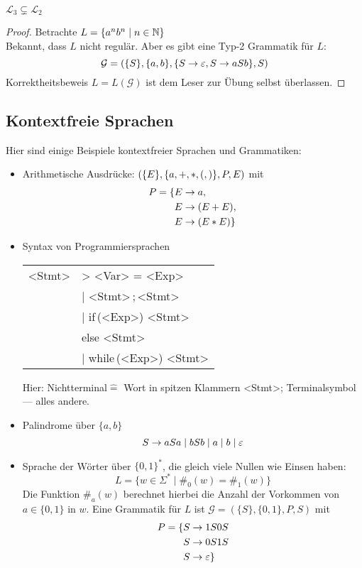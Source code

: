 {\begin{lemma}
	$\mathcal{L}_3 \subsetneq \mathcal{L}_2$
\end{lemma}
\begin{proof}
	Betrachte $L=\{a^nb^n \mid n\in\mathbb{N} \}$\\
	Bekannt, dass $L$ nicht regulär. 
	Aber es gibt eine Typ-2 Grammatik für $L$:
	\[ \mathcal{G} = (\{S\}, \{a,b\}, \{S\->\Eps, S\->aSb \}, S) \]
	Korrektheitsbeweis $L=L(\mathcal{G})$ ist dem Leser zur Übung selbst überlassen.
\end{proof}

\subsection{Kontextfreie Sprachen}
Hier sind einige Beispiele kontextfreier Sprachen und Grammatiken:
\begin{itemize}
\item Arithmetische Ausdrücke: $(\{E\}, \{a, \mathnormal{+}, \mathnormal{*}, \mathnormal{(}, \mathnormal{)}\}, P, E)$ mit
  \begin{displaymath}
    P =
    \begin{aligned}[t]
      \{ E &\->a, \\
        E &\->(E+E), \\
        E &\->(E*E) \}
    \end{aligned}
  \end{displaymath}
\item Syntax von Programmiersprachen%
	\begin{center}
		\begin{tabular}[t]{r@{ }l}
			<Stmt> &\-> <Var> = <Exp>\\
			&| <Stmt>\,;\,<Stmt>\\
			&| if\,(<Exp>) <Stmt>\\
			&\phantom{|} else <Stmt>\\
			&| while\,(<Exp>) <Stmt>
		\end{tabular}
	\end{center}%
	Hier: Nichtterminal$\hat=$ Wort in spitzen Klammern <Stmt>;
	Terminalsymbol --- alles andere.
\item Palindrome über $\{a,b\}$
	\[ S\-> aSa \mid bSb \mid a \mid b \mid \Eps \]
\item Sprache der Wörter über $\{0,1\}^*$, die gleich viele Nullen wie Einsen haben:
  \begin{displaymath}
    L = \{ w \in \Sigma^* \mid \#_0(w) = \#_1(w)\}
  \end{displaymath}
  Die Funktion $\#_a(w)$ berechnet hierbei die Anzahl der Vorkommen von $a \in \{0, 1\}$ in $w$.
  Eine Grammatik für $L$ ist $\mathcal{G} = (\{S\}, \{0,1\}, P, S)$ mit
  \begin{displaymath}
    P =
    \begin{aligned}[t]
      \{ S & \to 1S0S \\
        S & \to 0S1S \\
        S & \to \varepsilon
      \}
    \end{aligned}
  \end{displaymath}


\end{itemize}}
